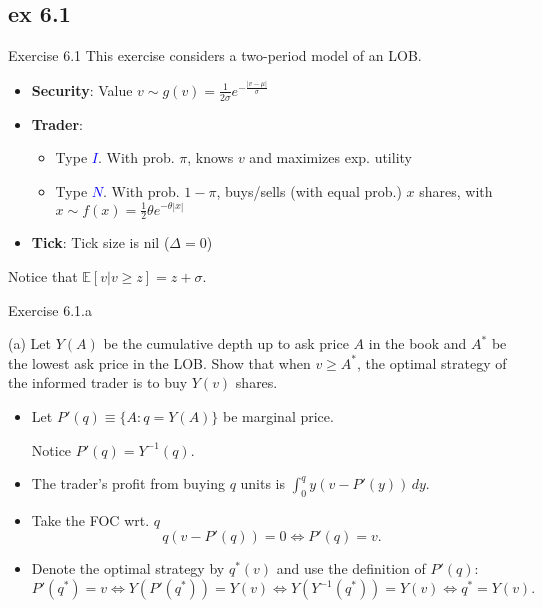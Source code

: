 \documentclass[english,10pt
,aspectratio=169
]{beamer}
\begin{document}
\subsection{ex 6.1}

\begin{frame}[label=ex1]{Exercise 6.1}
	This exercise considers a two-period model of an LOB.
	\begin{itemize}
		\item \textbf{Security}: Value $v \sim g(v)=\frac{1}{2\sigma} e^{-\frac{|v-\mu|}{\sigma}}$
		\item \textbf{Trader}: 
		\begin{itemize}
			\item Type \textcolor{blue}{$I$}. With prob. $\pi$, knows $v$ and maximizes exp. utility
			\item Type \textcolor{blue}{$N$}. With prob. $1-\pi$, buys/sells (with equal prob.) $x$ shares, with $x \sim f(x)=\frac{1}{2}\theta e^{-\theta |x|}$ 
		\end{itemize}
		\item \textbf{Tick}: Tick size is nil ($\Delta=0$)
	\end{itemize}
	Notice that $\mathbb{E}[v|v \ge z]=z+\sigma$.
\end{frame}


\begin{frame}{Exercise 6.1.a}
	\begin{exampleblock}{}
		(a) Let $Y(A)$ be the cumulative depth up to ask price $A$ in the book and $A^*$ be the lowest ask price in the LOB. Show that when $v \ge A^*$, the optimal strategy of the informed trader is to buy $Y(v)$ shares.
	\end{exampleblock}

	\pause

	\begin{itemize}
		\item Let $P'(q) \equiv \{A: q=Y(A)\}$ be marginal price.
		
		Notice $P'(q) = Y^{-1}(q)$.
		\item The trader's profit from buying $q$ units is $\int_0^q y(v-P'(y)) \, dy.$
		\item Take the FOC wrt. $q$
		\[
		q(v-P'(q))=0 \Leftrightarrow P'(q)=v.
		\]
		\item Denote the optimal strategy by $q^*(v)$ and use the definition of $P'(q)$:
		\[
		P'(q^*)=v \Leftrightarrow Y(P'(q^*))=Y(v) \Leftrightarrow Y(Y^{-1}(q^*))=Y(v) \Leftrightarrow q^*= Y(v).
		\]
	\end{itemize}
\end{frame}
\end{document}
